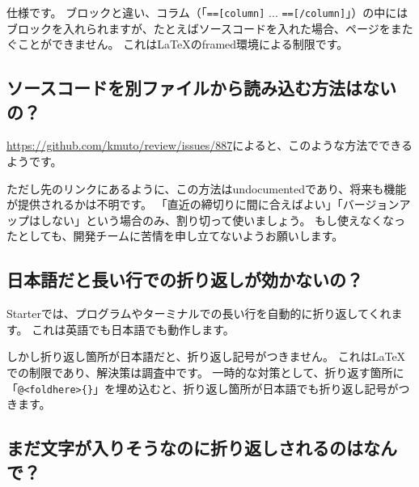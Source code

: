 仕様です。
ブロックと違い、コラム（「\texttt{==[column]} ... \texttt{==[/column]}」）の中にはブロックを入れられますが、たとえばソースコードを入れた場合、ページをまたぐことができません。
これは\LaTeX{}のframed環境による制限です。

\subsection*{ソースコードを別ファイルから読み込む方法はないの？}
\label{sec:2-4-3}

\url{https://github.com/kmuto/review/issues/887}によると、このような方法でできるようです。

\label{}
\begin{starterprogram}\end{starterprogram}

ただし先のリンクにあるように、この方法はundocumentedであり、将来も機能が提供されるかは不明です。
「直近の締切りに間に合えばよい」「バージョンアップはしない」という場合のみ、割り切って使いましょう。
もし使えなくなったとしても、開発チームに苦情を申し立てないようお願いします。

\subsection*{日本語だと長い行での折り返しが効かないの？}
\label{sec:2-4-4}

Starterでは、プログラムやターミナルでの長い行を自動的に折り返してくれます。
これは英語でも日本語でも動作します。

しかし折り返し箇所が日本語だと、折り返し記号がつきません。
これはLaTeXでの制限であり、解決策は調査中です。
一時的な対策として、折り返す箇所に「\texttt{@\textless{}foldhere\textgreater{}\{\}}」を埋め込むと、折り返し箇所が日本語でも折り返し記号がつきます。

\subsection*{まだ文字が入りそうなのに折り返しされるのはなんで？}
\label{sec:2-4-5}
\label{ikumq}

